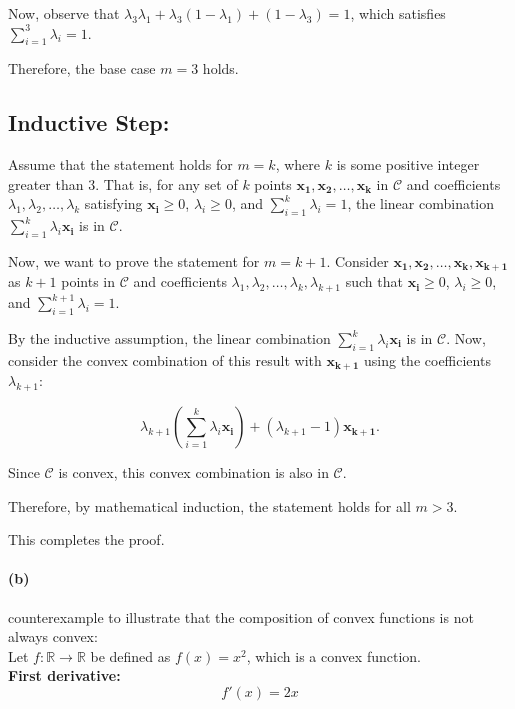 \documentclass[12pt]{article}
\begin{document}
Now, observe that $\lambda_3 \lambda_1 + \lambda_3 (1 - \lambda_1) + (1 - \lambda_3) = 1$, which satisfies $\sum_{i=1}^{3} \lambda_i = 1$.

Therefore, the base case $m = 3$ holds.
\subsection*{Inductive Step:}

Assume that the statement holds for $m = k$, where $k$ is some positive integer greater than $3$. That is, for any set of $k$ points $\mathbf{x_1, x_2, \ldots, x_k}$ in $\mathcal{C}$ and coefficients $\lambda_1, \lambda_2, \ldots, \lambda_k$ satisfying $\mathbf{x_i} \geq 0$, $\lambda_i \geq 0$, and $\sum_{i=1}^{k} \lambda_i = 1$, the linear combination $\sum_{i=1}^{k} \lambda_i \mathbf{x_i}$ is in $\mathcal{C}$.

Now, we want to prove the statement for $m = k + 1$. Consider $\mathbf{x_1, x_2, \ldots, x_k, x_{k+1}}$ as $k + 1$ points in $\mathcal{C}$ and coefficients $\lambda_1, \lambda_2, \ldots, \lambda_k, \lambda_{k+1}$ such that $\mathbf{x_i} \geq 0$, $\lambda_i \geq 0$, and $\sum_{i=1}^{k+1} \lambda_i = 1$.

By the inductive assumption, the linear combination $\sum_{i=1}^{k} \lambda_i \mathbf{x_i}$ is in $\mathcal{C}$. Now, consider the convex combination of this result with $\mathbf{x_{k+1}}$ using the coefficients $\lambda_{k+1}$:

\[
\lambda_{k+1} \left(\sum_{i=1}^{k} \lambda_i \mathbf{x_i}\right) + (\lambda_{k+1}-1) \mathbf{x_{k+1}}.
\]

Since $\mathcal{C}$ is convex, this convex combination is also in $\mathcal{C}$.

Therefore, by mathematical induction, the statement holds for all $m > 3$.

This completes the proof.


\paragraph{(b)}
counterexample to illustrate that the composition of convex functions is not always convex: \\

Let \( f: \mathbb{R} \rightarrow \mathbb{R} \) be defined as \( f(x) = x^2 \), which is a convex function. \\

\textbf{First derivative:}
\[ f'(x) = 2x \]
\end{document}
